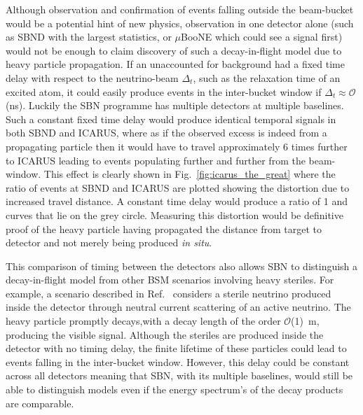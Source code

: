 \documentclass[11pt, a4paper]{article}
\newcommand{\reffig}[1]{Fig.~\ref{#1}}
\newcommand{\refref}[1]{Ref.~\cite{#1}}
\begin{document}
Although observation and confirmation of events falling outside the beam-bucket
would be a potential hint of new physics, observation in one detector alone (such as
SBND with the largest statistics, or $\mu$BooNE which could see a signal first)
would not be enough to claim discovery of such a decay-in-flight model due to
heavy particle propagation. If an unaccounted for background had a fixed time
delay with respect to the neutrino-beam $\Delta_t$, such as the relaxation time
of an excited atom, it could easily produce events in the inter-bucket window
if $\Delta_t \approx \mathcal{O}$(ns). Luckily the SBN programme has multiple
detectors at multiple baselines. Such a constant fixed time delay would produce
identical temporal signals in both SBND and ICARUS, where as if the observed
excess is indeed from a propagating particle then it would have to travel
approximately 6 times further to ICARUS leading to events populating further
and further from the beam-window. This effect is clearly shown in
\reffig{fig:icarus_the_great} where the ratio of events at SBND and ICARUS are
plotted showing the distortion due to increased travel distance. A constant
time delay would produce a ratio of 1 and curves that lie on the grey circle.
Measuring this distortion would be definitive proof of the heavy particle
having propagated the distance from target to detector and not merely being
produced \emph{in situ}.

This comparison of timing between the detectors also allows SBN to distinguish
a decay-in-flight model from other BSM scenarios involving heavy steriles. For
example, a scenario described in \refref{Gninenko:2009ks,Gninenko:2010pr}
considers a sterile neutrino produced inside the detector through neutral
current scattering of an active neutrino. The heavy particle promptly
decays,with a decay length of the order $\mathcal{O}$(1)~m, producing the
visible signal. Although the steriles are produced inside the detector with no
timing delay, the finite lifetime of these particles could lead to events
falling in the inter-bucket window. However, this delay could be constant
across all detectors meaning that SBN, with its multiple baselines, would still
be able to distinguish models even if the energy spectrum's of the decay
products are comparable.
\end{document}
